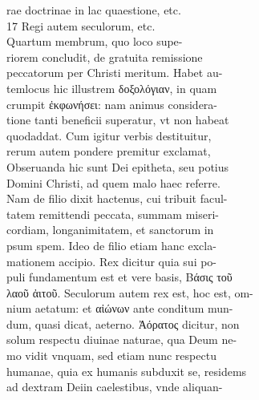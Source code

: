 \documentclass{article}
\begin{document}
\begin{pages}
                rae doctrinae in lac quaestione, etc. \\
                17 Regi autem seculorum, etc. \\
                Quartum membrum, quo loco supe- \\
                riorem concludit, de gratuita remissione \\
                peccatorum per Christi meritum. Habet au- \\
                temlocus hic illustrem δοξολόγιαν, in quam \\
                crumpit ἐκφωνήσει: nam animus considera- \\
                tione tanti beneficii superatur, vt non habeat \\
                quodaddat. Cum igitur verbis destituitur, \\
                rerum autem pondere premitur exclamat, \\
                Obseruanda hic sunt Dei epitheta, seu potius \\
                Domini Christi, ad quem malo haec referre. \\
                Nam de filio dixit hactenus, cui tribuit facul- \\
                tatem remittendi peccata, summam miseri- \\
                cordiam, longanimitatem, et sanctorum in \\
                psum spem. Ideo de filio etiam hanc excla- \\
                mationem accipio. Rex dicitur quia sui po- \\
                puli fundamentum est et vere basis, Βάσις τοῦ \\
                λαοῦ ἀιτοῦ. Seculorum autem rex est, hoc est, om- \\
                nium aetatum: et αἰώνων ante conditum mun- \\
                dum, quasi dicat, aeterno. Ἀόρατος dicitur, non \\
                solum respectu diuinae naturae, qua Deum ne- \\
                mo vidit vnquam, sed etiam nunc respectu \\
                humanae, quia ex humanis subduxit se, residems \\
                ad dextram Deiin caelestibus, vnde aliquan- \\
\end{pages}
\end{document}
